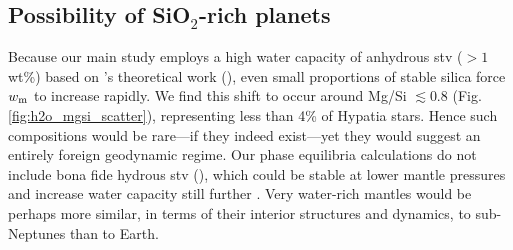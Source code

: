 \documentclass[fleqn,usenatbib]{mnras}
\newcommand{\todo}[1]{\textit{\textcolor{violet}{{#1}}}}
\begin{document}










\subsection{Possibility of SiO$_2$-rich planets}\label{sec:discussion-sio2}

Because our main study employs a high water capacity of anhydrous stv ($>1$ wt\%) based on \citeauthor{panero_hydrogen_2004}'s theoretical work (\citeyear{panero_hydrogen_2004}), even small proportions of stable silica force $w_{\rm m}$ to increase rapidly. We find this shift to occur around Mg/Si $\lesssim 0.8$ (Fig. \ref{fig:h2o_mgsi_scatter}), representing less than 4\% of Hypatia stars. Hence such compositions would be rare---if they indeed exist---yet they would suggest an entirely foreign geodynamic regime. Our phase equilibria calculations do not include bona fide hydrous stv (), which could be stable at lower mantle pressures and increase water capacity still further \citep[see][]{nisr_large_2020}. Very water-rich mantles would be perhaps more similar, in terms of their interior structures and dynamics, to sub-Neptunes than to Earth.
\end{document}
